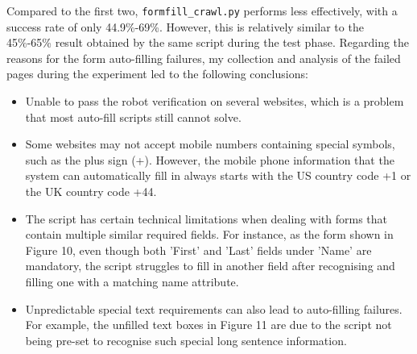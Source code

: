 \documentclass[ oneside,%
                    author={Cassie Qing Tang},
                    degree={BSc},
                     title={An Automated Response System for Disrupting Online Pet Scamming \\ },
                    subtitle={ }]{dissertation}
\begin{document}
Compared to the first two, \texttt{formfill\_crawl.py} performs less effectively, with a success rate of only 44.9\%-69\%. However, this is relatively similar to the 45\%-65\% result obtained by the same script during the test phase. Regarding the reasons for the form auto-filling failures, my collection and analysis of the failed pages during the experiment led to the following conclusions:
\begin{itemize}
  \item Unable to pass the robot verification on several websites, which is a problem that most auto-fill scripts still cannot solve.
  \item Some websites may not accept mobile numbers containing special symbols, such as the plus sign (+). However, the mobile phone information that the system can automatically fill in always starts with the US country code +1 or the UK country code +44.
  \item The script has certain technical limitations when dealing with forms that contain multiple similar required fields. For instance, as the form shown in Figure 10, even though both 'First' and 'Last' fields under 'Name' are mandatory, the script struggles to fill in another field after recognising and filling one with a matching name attribute.
  \item Unpredictable special text requirements can also lead to auto-filling failures. For example, the unfilled text boxes in Figure 11 are due to the script not being pre-set to recognise such special long sentence information.
\end{itemize}
\end{document}

